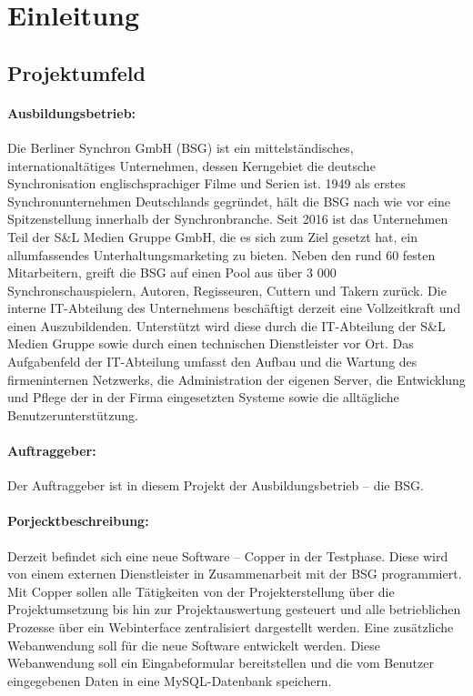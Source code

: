 \section{Einleitung}
\label{sec:Einleitung}
\subsection{Projektumfeld} 
\label{sec:Projektumfeld}
\paragraph*{Ausbildungsbetrieb: } Die Berliner Synchron GmbH (BSG) ist ein mittelständisches, internationaltätiges Unternehmen, dessen Kerngebiet die deutsche Synchronisation englischsprachiger Filme und Serien ist. 1949 als erstes Synchronunternehmen Deutschlands gegründet, hält die BSG nach wie vor eine Spitzenstellung innerhalb der Synchronbranche. Seit 2016 ist das Unternehmen Teil der S\&L Medien Gruppe GmbH, die es sich zum Ziel gesetzt hat, ein allumfassendes Unterhaltungsmarketing zu bieten. Neben den rund 60 festen Mitarbeitern, greift die BSG auf einen Pool aus über 3 000 Synchronschauspielern, Autoren, Regisseuren, Cuttern und Takern zurück. Die interne IT-Abteilung des Unternehmens beschäftigt derzeit eine Vollzeitkraft und einen Auszubildenden. Unterstützt wird diese durch die IT-Abteilung der S\&L Medien Gruppe sowie durch einen technischen Dienstleister vor Ort. Das Aufgabenfeld der IT-Abteilung umfasst den Aufbau und die Wartung des firmeninternen Netzwerks, die Administration der eigenen Server, die Entwicklung und Pflege der in der Firma eingesetzten Systeme sowie die alltägliche Benutzerunterstützung.

\paragraph*{Auftraggeber: } Der Auftraggeber ist in diesem Projekt der Ausbildungsbetrieb – die BSG.

\paragraph*{Porjecktbeschreibung: }Derzeit befindet sich eine neue Software – Copper in der Testphase. Diese wird von einem externen Dienstleister in Zusammenarbeit mit der BSG programmiert. Mit Copper sollen alle Tätigkeiten von der Projekterstellung über die Projektumsetzung bis hin zur Projektauswertung gesteuert und alle betrieblichen Prozesse über ein Webinterface zentralisiert dargestellt werden. Eine zusätzliche Webanwendung soll für die neue Software entwickelt werden. Diese Webanwendung soll ein Eingabeformular bereitstellen und die vom Benutzer eingegebenen Daten in eine MySQL-Datenbank speichern.

